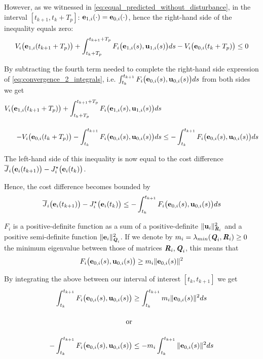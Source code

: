 \begin{gg_box}
  However, as we witnessed in \eqref{eq:equal_predicted_without_disturbance},
  in the interval $[t_{k+1}, t_k + T_p]$:
  $\bm{\mathbf{e}}_{1,i}(\cdot) = \bm{\mathbf{e}}_{0,i}(\cdot)$, hence the right-hand
  side of the inequality equals zero:
  \begin{align}
    V_i\big(\bm{\mathbf{e}}_{1,i}(t_{k+1} + T_p)\big)
    + \int_{t_k + T_p}^{t_{k+1} + T_p} F_i\big(\bm{\mathbf{e}}_{1,i}(s), \bm{\mathbf{u}}_{1,i}(s)\big) ds
    - V_i\big(\bm{\mathbf{e}}_{0,i}(t_k + T_p)\big) \leq 0
  \end{align}

  By subtracting the fourth term needed to complete the right-hand side
  expression of \eqref{eq:convergence_2_integrals}, i.e.
  $\int_{t_k}^{t_{k+1}} F_i \big(\bm{\mathbf{e}}_{0,i}(s), \bm{\mathbf{u}}_{0,i} (s)\big) d s$
  from both sides we get
  \begin{align}
    V_i\big(\bm{\mathbf{e}}_{1,i}(t_{k+1} + T_p)\big)
    + \int_{t_k + T_p}^{t_{k+1} + T_p} F_i\big(\bm{\mathbf{e}}_{1,i}(s), \bm{\mathbf{u}}_{1,i}(s)\big) ds& \\[2.5ex]
    - V_i\big(\bm{\mathbf{e}}_{0,i}(t_k + T_p)\big)
    -\int_{t_k}^{t_{k+1}} F_i \big(\bm{\mathbf{e}}_{0,i}(s), \bm{\mathbf{u}}_{0,i} (s)\big) d s
    &\leq -\int_{t_k}^{t_{k+1}} F_i \big(\bm{\mathbf{e}}_{0,i}(s), \bm{\mathbf{u}}_{0,i} (s)\big) d s
  \end{align}

  The left-hand side of this inequality is now equal to the cost difference
  $\overline{J}_i\big(\bm{\mathbf{e}}_i(t_{k+1})\big) - J_i^{\star}\big(\bm{\mathbf{e}}_i(t_k)\big)$.
\end{gg_box}
Hence, the cost difference becomes bounded by
\begin{align}
  \overline{J}_i\big(\bm{\mathbf{e}}_i(t_{k+1})\big) - J_i^{\star}\big(\bm{\mathbf{e}}_i(t_k)\big) \leq
    -\int_{t_k}^{t_{k+1}} F_i \big(\bm{\mathbf{e}}_{0,i}(s), \bm{\mathbf{u}}_{0,i} (s)\big) ds
\end{align}
\begin{gg_box}
  $F_i$ is a positive-definite function as a sum of a positive-definite
  $\|\bm{\mathbf{u}}_i\|^2_{\bm{\mathit{R}}_i}$ and a positive semi-definite function
  $\|\bm{\mathbf{e}}_i\|^2_{\bm{\mathit{Q}}_i}$. If we denote by
  $m_i = \lambda_{min}(\bm{\mathit{Q}}_i, \bm{\mathit{R}}_i) \geq 0$ the minimum eigenvalue
  between those of matrices $\bm{\mathit{R}}_i, \bm{\mathit{Q}}_i$, this means that
  \begin{align}
    F_i \big(\bm{\mathbf{e}}_{0,i}(s), \bm{\mathbf{u}}_{0,i} (s)\big) \geq m_i \|\bm{\mathbf{e}}_{0,i}(s)\|^2
  \end{align}

  By integrating the above between our interval of interest $[t_k, t_{k+1}]$ we get
  \begin{align}
    \int_{t_k}^{t_{k+1}} F_i \big(\bm{\mathbf{e}}_{0,i}(s), \bm{\mathbf{u}}_{0,i} (s)\big) &\geq \int_{t_k}^{t_{k+1}} m_i \|\bm{\mathbf{e}}_{0,i}(s)\|^2 ds \\[2.5ex]
    \text{or}\\[2.5ex]
    -\int_{t_k}^{t_{k+1}} F_i \big(\bm{\mathbf{e}}_{0,i}(s), \bm{\mathbf{u}}_{0,i} (s)\big) &\leq -m_i \int_{t_k}^{t_{k+1}} \|\bm{\mathbf{e}}_{0,i}(s)\|^2 ds
  \end{align}
\end{gg_box}

